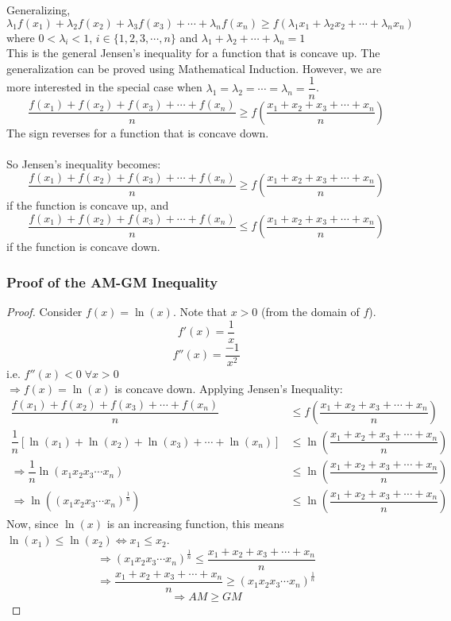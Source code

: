 \documentclass[14]{article}
\theoremstyle{definition}
\theoremstyle{case}
\begin{document}
Generalizing,\\
\[\lambda_1 f(x_1) + \lambda_2 f(x_2) + \lambda_3 f(x_3) + \cdots + \lambda_n f(x_n) \geq f\left( \lambda_1 x_1 + \lambda_2 x_2 + \cdots + \lambda_n x_n \right)\]
where $0 < \lambda_i < 1$, $i \in \{1, 2, 3, \cdots, n\}$ and $\lambda_1 + \lambda_2 + \cdots + \lambda_n = 1$\\
This is the general Jensen's inequality for a function that is concave up. The generalization can be proved using Mathematical Induction. However, we are more interested in the special case when $\lambda_1 = \lambda_2 = \cdots = \lambda_n = \dfrac1{n}$.\\
\[\dfrac{f(x_1) + f(x_2) + f(x_3) + \cdots + f(x_n)}{n} \geq f\left(\dfrac{x_1 + x_2 + x_3 + \cdots + x_n}{n}\right)\]
\pagebreak
The sign reverses for a function that is concave down.\\\\
So Jensen's inequality becomes:
\[\dfrac{f(x_1) + f(x_2) + f(x_3) + \cdots + f(x_n)}{n} \geq f\left(\dfrac{x_1 + x_2 + x_3 + \cdots + x_n}{n}\right)\]
if the function is concave up, and
\[\dfrac{f(x_1) + f(x_2) + f(x_3) + \cdots + f(x_n)}{n} \leq f\left(\dfrac{x_1 + x_2 + x_3 + \cdots + x_n}{n}\right)\]
if the function is concave down.
\subsubsection{Proof of the AM-GM Inequality}
\begin{proof}
Consider $f(x) = \ln(x)$. Note that $x > 0$ (from the domain of $f$).\\
\[f'(x) = \dfrac1x\]
\[f''(x) = \dfrac{-1}{x^2}\]
i.e. $f''(x) < 0 \; \forall x > 0$\\
$\Rightarrow f(x) = \ln(x)$ is concave down. Applying Jensen's Inequality:\\
\begin{align*}
\dfrac{f(x_1) + f(x_2) + f(x_3) + \cdots + f(x_n)}{n} &\leq f\left( \dfrac{x_1 + x_2 + x_3 + \cdots + x_n}{n} \right)\\
\dfrac1{n}\left[\ln(x_1) + \ln(x_2) + \ln(x_3) + \cdots + \ln(x_n)\right] &\leq \ln\left( \dfrac{x_1 + x_2 + x_3 + \cdots + x_n}{n} \right)\\
\Rightarrow \dfrac1n \ln \left( x_1 x_2 x_3 \cdots x_n\right)&\leq \ln\left( \dfrac{x_1 + x_2 + x_3 + \cdots + x_n}{n} \right)\\
\Rightarrow \ln \left( (x_1 x_2 x_3 \cdots x_n)^\frac1n \right)&\leq \ln\left( \dfrac{x_1 + x_2 + x_3 + \cdots + x_n}{n} \right)
\end{align*}
Now, since $\ln(x)$ is an increasing function, this means $\ln(x_1) \leq \ln(x_2) \Leftrightarrow x_1 \leq x_2$.
\[\Rightarrow (x_1 x_2 x_3 \cdots x_n)^{\frac1n}\leq \dfrac{x_1 + x_2 + x_3 + \cdots + x_n}{n}\]
\[\Rightarrow\dfrac{x_1 + x_2 + x_3 + \cdots + x_n}{n} \geq (x_1 x_2 x_3 \cdots x_n)^{\frac1n} \]
\[\Rightarrow AM \geq GM\]
\end{proof}
\pagebreak
\end{document}
